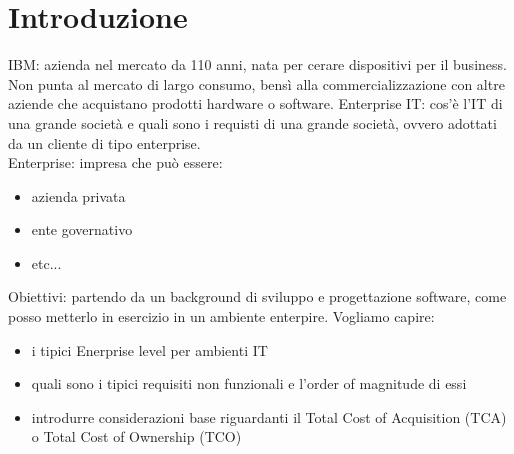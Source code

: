 \documentclass{article}
\begin{document}
\section{Introduzione}
IBM: azienda nel mercato da 110 anni, nata per cerare dispositivi per il business. Non punta al mercato di largo consumo, bensì alla commercializzazione con altre aziende che acquistano prodotti hardware o software. Enterprise IT: cos'è l'IT di una grande società e quali sono i requisti di una grande società, ovvero adottati da un cliente di tipo enterprise.\\ Enterprise: impresa che può essere:
\begin{itemize}
\item azienda privata
\item ente governativo
\item etc...
\end{itemize}
Obiettivi: partendo da un background di sviluppo e progettazione software, come posso metterlo in esercizio in un ambiente enterpire. Vogliamo capire:
\begin{itemize}
\item i tipici Enerprise level per ambienti IT
\item quali sono i tipici requisiti non funzionali e l'order of magnitude di essi
\item introdurre considerazioni base riguardanti il Total Cost of Acquisition (TCA) o Total Cost of Ownership (TCO)
\end{itemize}
\end{document}
